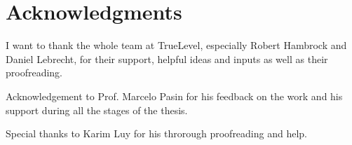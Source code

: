 \chapter*{Acknowledgments}

I want to thank the whole team at TrueLevel, especially Robert Hambrock and
Daniel Lebrecht, for their support, helpful ideas and inputs as well as their
proofreading.

Acknowledgement to Prof. Marcelo Pasin for his feedback on the work and his
support during all the stages of the thesis.

Special thanks to Karim Luy for his throrough proofreading and help.
